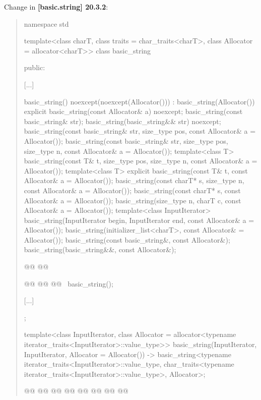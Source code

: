 \documentclass{wg21}
\begin{document}
Change in \textbf{[basic.string] 20.3.2}:
\begin{quote}
\begin{codeblock}
namespace std {
template<class charT, class traits = char_traits<charT>,
class Allocator = allocator<charT>>
class basic_string {
    public:

    [...]

    basic_string() noexcept(noexcept(Allocator())) : basic_string(Allocator()) { }
    explicit basic_string(const Allocator& a) noexcept;
    basic_string(const basic_string& str);
    basic_string(basic_string&& str) noexcept;
    basic_string(const basic_string& str, size_type pos, const Allocator& a = Allocator());
    basic_string(const basic_string& str, size_type pos, size_type n,
    const Allocator& a = Allocator());
    template<class T>
    basic_string(const T& t, size_type pos, size_type n, const Allocator& a = Allocator());
    template<class T>
    explicit basic_string(const T& t, const Allocator& a = Allocator());
    basic_string(const charT* s, size_type n, const Allocator& a = Allocator());
    basic_string(const charT* s, const Allocator& a = Allocator());
    basic_string(size_type n, charT c, const Allocator& a = Allocator());
    template<class InputIterator>
    basic_string(InputIterator begin, InputIterator end, const Allocator& a = Allocator());
    basic_string(initializer_list<charT>, const Allocator& = Allocator());
    basic_string(const basic_string&, const Allocator&);
    basic_string(basic_string&&, const Allocator&);

    @@
    @@

    @@
    @@
    @@
    ~basic_string();

    [...]
};

template<class InputIterator,
class Allocator = allocator<typename iterator_traits<InputIterator>::value_type>>
basic_string(InputIterator, InputIterator, Allocator = Allocator())
-> basic_string<typename iterator_traits<InputIterator>::value_type,
char_traits<typename iterator_traits<InputIterator>::value_type>,
Allocator>;

@@
@@
@@
@@
@@
@@
@@
@\added{	>;}@

}
\end{codeblock}
\end{quote}
\end{document}

